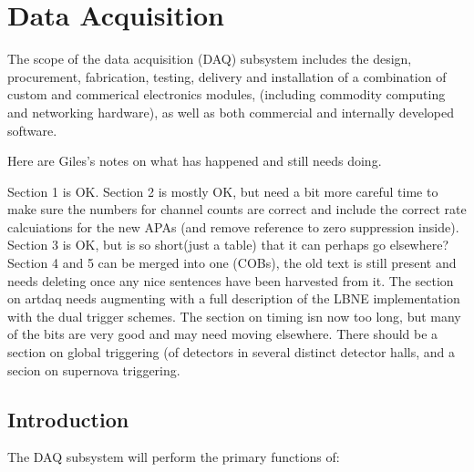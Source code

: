 

\newcommand{\LBNE}{[Expt-name] }

\chapter{Data Acquisition}
\label{ch:trig}

The scope of the data acquisition (DAQ) subsystem includes the 
design, procurement, fabrication, testing, delivery and installation 
of a combination of custom and commerical electronics modules, (including 
commodity computing and networking hardware), as well as both commercial 
and internally developed software.   

\begin{editornote} 
\begin{center}
\end{center}
\end{editornote}
\begin{editornote} 
Here are Giles's notes on what has happened and still needs doing.

Section 1 is OK.  Section 2 is mostly OK, but need a bit more careful
time to make sure the numbers for channel counts are correct and
include the correct rate calcuiations for the new APAs (and remove
reference to zero suppression inside).  Section 3 is OK, but is so
short(just a table) that it can perhaps go elsewhere?  Section 4 and 5
can be merged into one (COBs), the old text is still present and needs
deleting once any nice sentences have been harvested from it.  The
section on artdaq needs augmenting with a full description of the LBNE
implementation with the dual trigger schemes.  The section on timing
isn now too long, but many of the bits are very good and may need
moving elsewhere.  There should be a section on global triggering (of
detectors in several distinct detector halls, and a secion on
supernova triggering.
\end{editornote}

\section{Introduction}
The DAQ subsystem will perform the primary functions of:

